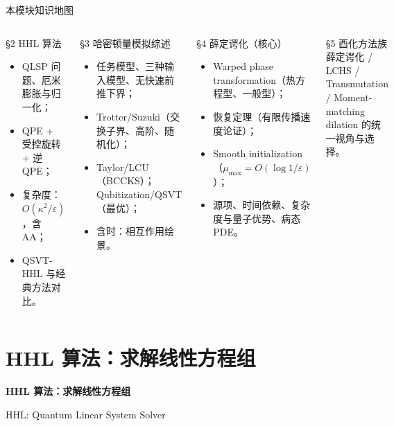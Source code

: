\documentclass[aspectratio=169,9pt]{ctexbeamer}
\newcommand{\eps}{\varepsilon}
\newcommand{\smallcite}[1]{\par\vspace{1.2mm}{\scriptsize\color{graytext}#1}}
\begin{document}
\begin{frame}{本模块知识地图}
\begin{columns}[T,totalwidth=\textwidth]
\begin{keybox}{§2 HHL 算法}
\begin{itemize}
\item QLSP 问题、厄米膨胀与归一化；
\item QPE + 受控旋转 + 逆 QPE；
\item 复杂度：$O(\kappa^2/\eps)$，含 AA；
\item QSVT-HHL 与经典方法对比。
\end{itemize}
\end{keybox}
\begin{keybox}{§3 哈密顿量模拟综述}
\begin{itemize}
\item 任务模型、三种输入模型、无快速前推下界；
\item Trotter/Suzuki（交换子界、高阶、随机化）；
\item Taylor/LCU（BCCKS）；Qubitization/QSVT（最优）；
\item 含时：相互作用绘景。
\end{itemize}
\end{keybox}
\begin{keybox}{§4 薛定谔化（核心）}
\begin{itemize}
\item Warped phase transformation（热方程型、一般型）；
\item 恢复定理（有限传播速度论证）；
\item Smooth initialization（$\mu_{\max}=O(\log 1/\eps)$）；
\item 源项、时间依赖、复杂度与量子优势、病态 PDE。
\end{itemize}
\end{keybox}
\begin{keybox}{§5 酉化方法族}
薛定谔化 / LCHS / Transmutation / Moment-matching dilation 的统一视角与选择。
\end{keybox}
\end{columns}
\smallcite{Model 4 笔记各节。}
\end{frame}

\section{HHL 算法：求解线性方程组}
\begin{frame}[plain]
\centering\vspace{2.0cm}
{\Huge\bfseries\color{navy} HHL 算法：求解线性方程组}\par\vspace{4mm}
{\large HHL: Quantum Linear System Solver}
\end{frame}
\end{document}
